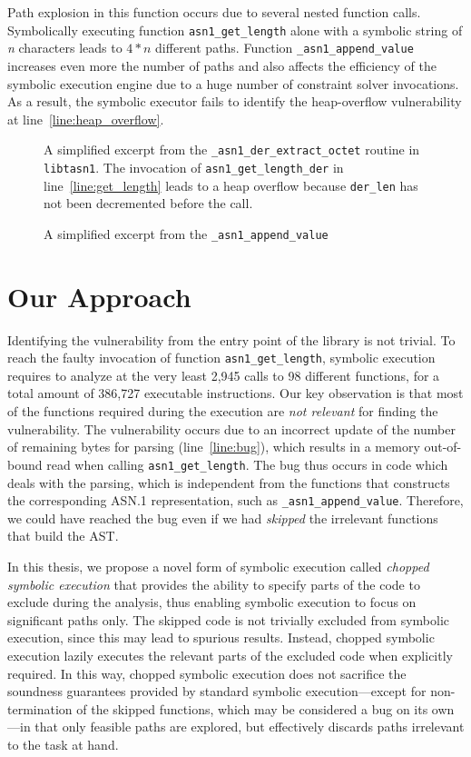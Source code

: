 Path explosion in this function occurs due to several nested function
calls. Symbolically executing function \texttt{asn1\_get\_length} alone with
a symbolic string of \textit{n} characters leads to $4*n$ different paths.
Function \texttt{\_asn1\_append\_value} increases even more the number
of paths and also affects the efficiency of the symbolic execution
engine due to a huge number of constraint solver invocations. As a
result, the symbolic executor fails to identify the heap-overflow
vulnerability at line~\ref{line:heap_overflow}.

\begin{figure}

\caption{
A simplified excerpt from the \texttt{\_asn1\_der\_extract\_octet} routine
in \texttt{libtasn1}. The invocation of \texttt{asn1\_get\_length\_der} in
line~\ref{line:get_length} leads to a heap overflow because
\texttt{der\_len} has not been decremented before the call.
}
\label{fig:intro-1}
\end{figure}

\begin{figure}

\caption{A simplified excerpt from the \texttt{\_asn1\_append\_value}}
\label{fig:intro-2}
\end{figure}

\section{Our Approach}
Identifying the vulnerability from the entry point of the library is not trivial.
To reach the faulty invocation of function \texttt{asn1\_get\_length},
symbolic execution requires to analyze at the very least 2,945 calls
to 98 different functions, for a total amount of 386,727 executable
instructions. Our key observation is that most of the functions
required during the execution are \textit{not relevant} for finding
the vulnerability. The vulnerability occurs due to an incorrect update
of the number of remaining bytes for parsing (line~\ref{line:bug}), which
results in a memory out-of-bound read when calling
\texttt{asn1\_get\_length}. The bug thus occurs in code which deals with the
parsing, which is independent from the functions that constructs the
corresponding ASN.1 representation, such as \texttt{\_asn1\_append\_value}.
Therefore, we could have reached the bug even if we had \emph{skipped}
the irrelevant functions that build the AST.

In this thesis, we propose a novel form of symbolic execution called
\emph{chopped symbolic execution} that provides the ability to specify
parts of the code to exclude during the analysis, thus enabling
symbolic execution to focus on significant paths only. The skipped
code is not trivially excluded from symbolic execution, since this may
lead to spurious results. Instead, chopped symbolic execution lazily
executes the relevant parts of the excluded code when explicitly
required. In this way, chopped symbolic execution does not sacrifice
the soundness guarantees provided by standard symbolic
execution---except for non-termination of the skipped functions, which
may be considered a bug on its own---in that only feasible paths are
explored, but effectively discards paths irrelevant to the task at
hand.

